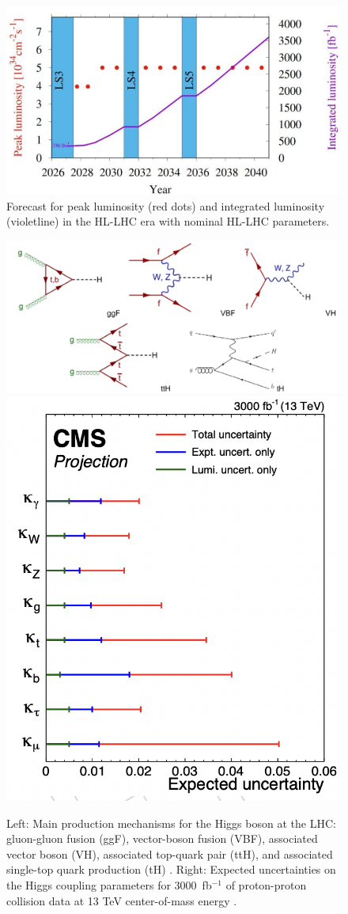 \documentclass[final,12pt]{article}
\newcommand{\lumi}[1]{{#1~fb$^{-1}$}}
\begin{document}
\begin{figure}[H]
  \centering
  \includegraphics[width=0.8\columnwidth]{./lumint.png}
  \caption{Forecast for peak luminosity (red dots) and integrated luminosity (violetline) in the HL-LHC era with nominal HL-LHC parameters\cite{BejarAlonso:2749422}.}  %
  \label{figure6}
\end{figure}


 \begin{figure}[H]
   \centering
   \includegraphics[width=0.7\columnwidth]{./pg.png}
   \includegraphics[width=0.29\columnwidth]{./higgs_couplings.png}
   \caption{
     Left: Main production mechanisms for the Higgs boson at the LHC: gluon-gluon fusion (ggF), vector-boson fusion (VBF), associated vector boson (VH), associated top-quark pair (ttH), and  associated single-top quark production (tH)  \cite{Grojean:2017hsb-corr}  \cite{Khachatryan:2015ota} .
     Right: Expected uncertainties on the Higgs coupling parameters for  \lumi{3000} of proton-proton collision data at 13 TeV center-of-mass energy \cite{Cepeda:2019klc-corr}.
   }
   \label{figureKappasUncs}
 \end{figure}
\end{document}
